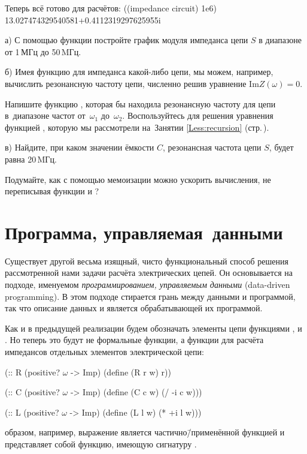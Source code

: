 Теперь всё готово для расчётов:
\REPL
  {((impedance circuit) 1e6)}
  {13.027474329540581+0.4112319297625955i}

\begin{Assignment}
а) С помощью функции  постройте график модуля импеданса цепи $S$ в диапазоне от 1\,МГц до 50\,MГц.

б) Имея функцию для импеданса какой-либо цепи, мы можем, например, вычислить резонансную частоту цепи, численно решив уравнение $\mathrm{Im} Z(\omega) = 0$.

Напишите функцию , которая бы находила резонансную частоту для цепи  в~диапазоне частот от~$\omega_1$ до~$\omega_2$. Воспользуйтесь для решения уравнения функцией , которую мы рассмотрели на~Занятии \ref{Less:recursion}  (стр.\,\pageref{bisection}).

в) Найдите, при каком значении ёмкости $C$, резонансная частота цепи $S$, будет равна 20\,MГц. 

Подумайте, как с помощью мемоизации можно ускорить вычисления, не переписывая функции  и ?
\end{Assignment}

\section{Программа, \mbox{управляемая данными}}%
Существует другой весьма изящный, чисто функциональный способ решения рассмотренной нами задачи расчёта электрических цепей. Он основывается на подходе, именуемом \emph{программированием, управляемым данными} (data-driven programming). В этом подходе стирается грань между данными и программой, так что описание данных и является обрабатывающей их программой.

Как и в предыдущей реализации будем обозначать элементы цепи функциями ,  и . Но теперь это будут не формальные функции, а функции для расчёта импедансов отдельных элементов электрической цепи:
\begin{Definition}[emph={r,c,l,w}]
(:: R (positive? $\omega$ -> Imp)
  (define (R r w) r))

(:: C (positive? $\omega$ -> Imp)
  (define (C c w) (/ -i c w)))

(:: L (positive? $\omega$ -> Imp)
  (define (L l w) (* +i l w)))
\end{Definition}
 образом, например, выражение  является частично\=/применённой функцией  и представляет собой функцию, имеющую сигнатуру .

